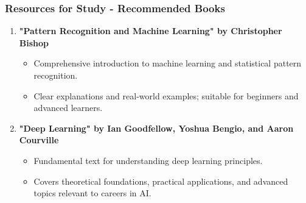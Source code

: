\documentclass[aspectratio=169]{beamer}
\begin{document}
\begin{frame}[fragile]
    \frametitle{Resources for Study - Recommended Books}
    \begin{enumerate}
        \item \textbf{"Pattern Recognition and Machine Learning" by Christopher Bishop}
        \begin{itemize}
            \item Comprehensive introduction to machine learning and statistical pattern recognition.
            \item Clear explanations and real-world examples; suitable for beginners and advanced learners.
        \end{itemize}
        
        \item \textbf{"Deep Learning" by Ian Goodfellow, Yoshua Bengio, and Aaron Courville}
        \begin{itemize}
            \item Fundamental text for understanding deep learning principles.
            \item Covers theoretical foundations, practical applications, and advanced topics relevant to careers in AI.
        \end{itemize}
    \end{enumerate}
\end{frame}
\end{document}
